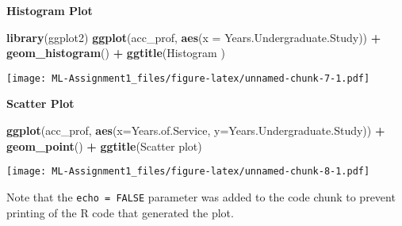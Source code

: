 \documentclass[
]{article}
\newenvironment{Shaded}{\begin{snugshade}}{\end{snugshade}}
\newcommand{\DataTypeTok}[1]{\textcolor[rgb]{0.13,0.29,0.53}{#1}}
\newcommand{\KeywordTok}[1]{\textcolor[rgb]{0.13,0.29,0.53}{\textbf{#1}}}
\newcommand{\NormalTok}[1]{#1}
\newcommand{\OperatorTok}[1]{\textcolor[rgb]{0.81,0.36,0.00}{\textbf{#1}}}
\newcommand{\StringTok}[1]{\textcolor[rgb]{0.31,0.60,0.02}{#1}}
\begin{document}
\textbf{Histogram Plot}

\begin{Shaded}
\begin{Highlighting}[]
\KeywordTok{library}\NormalTok{(ggplot2)}
\KeywordTok{ggplot}\NormalTok{(acc\_prof, }\KeywordTok{aes}\NormalTok{(}\DataTypeTok{x =}\NormalTok{ Years.Undergraduate.Study)) }\OperatorTok{+}
\StringTok{  }\KeywordTok{geom\_histogram}\NormalTok{() }\OperatorTok{+}\StringTok{ }
\StringTok{  }\KeywordTok{ggtitle}\NormalTok{(}\StringTok{\textquotesingle{}Histogram \textquotesingle{}}\NormalTok{)}
\end{Highlighting}
\end{Shaded}

\texttt{[image: ML-Assignment1\_files/figure-latex/unnamed-chunk-7-1.pdf]}

\textbf{Scatter Plot}

\begin{Shaded}
\begin{Highlighting}[]
\KeywordTok{ggplot}\NormalTok{(acc\_prof, }\KeywordTok{aes}\NormalTok{(}\DataTypeTok{x=}\NormalTok{Years.of.Service, }\DataTypeTok{y=}\NormalTok{Years.Undergraduate.Study)) }\OperatorTok{+}\StringTok{ }
\StringTok{  }\KeywordTok{geom\_point}\NormalTok{() }\OperatorTok{+}
\StringTok{  }\KeywordTok{ggtitle}\NormalTok{(}\StringTok{\textquotesingle{}Scatter plot\textquotesingle{}}\NormalTok{)}
\end{Highlighting}
\end{Shaded}

\texttt{[image: ML-Assignment1\_files/figure-latex/unnamed-chunk-8-1.pdf]}

Note that the \texttt{echo\ =\ FALSE} parameter was added to the code
chunk to prevent printing of the R code that generated the plot.
\end{document}
